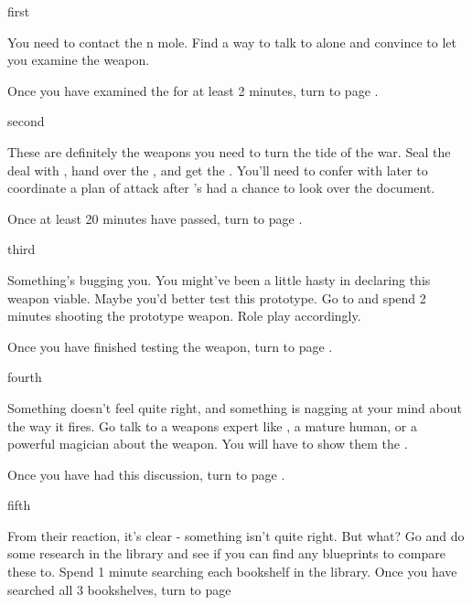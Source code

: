 \documentclass[greennotebook]{NeptuneBall}
\begin{document}

\startnotebook{\nIllicitWeapons{}}

\begin{page}{first}

You need to contact the \pAtlantis{}n mole. Find a way to talk to \cGeneral{} alone and convince \cGeneral{\them} to let you examine the weapon.

Once you have examined the \iPrototype{} for at least 2 minutes, turn to page .

\end{page}

\begin{page}{second}

These are definitely the weapons you need to turn the tide of the war. Seal the deal with \cGeneral{}, hand over the \iBattlePlan{}, and get the \iPrototype{}. You'll need to confer with \cGeneral{\them} later to coordinate a plan of attack after \cGeneral{\they}'s had a chance to look over the document.  

Once at least 20 minutes have passed, turn to page .

\end{page}

\begin{page}{third}

Something's bugging you. You might've been a little hasty in declaring this weapon viable. Maybe you'd better test this prototype. Go to \sGardens{} and spend 2 minutes shooting the prototype weapon. Role play accordingly.

Once you have finished testing the weapon, turn to page .

\end{page}

\begin{page}{fourth}

Something doesn't feel quite right, and something is nagging at your mind about the way it fires. Go talk to a weapons expert like \cPrince{}, a mature human, or a powerful magician about the weapon. You will have to show them the \iPrototype{}. 

Once you have had this discussion, turn to page .

\end{page}

\begin{page}{fifth}

From their reaction, it's clear - something isn't quite right. But what? Go and do some research in the library and see if you can find any blueprints to compare these to. Spend 1 minute searching each bookshelf in the library. Once you have searched all 3 bookshelves, turn to page 

\end{page}
\end{document}
